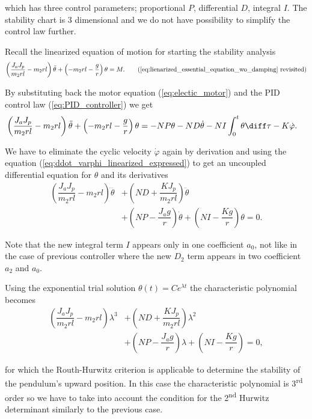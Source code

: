 \noindent
which has three control parameters; proportional $P$, differential $D$, integral $I$. The stability chart is 3 dimensional and we do not have possibility to simplify the control law further.

Recall the linearized equation of motion for starting the stability analysis
\begin{align*}
	\left(\dfrac{J_a J_p}{m_2 r l}- m_2 r l\right) \ddot \theta + \left(-m_2 r l - \dfrac{g}{r}\right) \theta = M. \tag{\ref{eq:lienarized_essential_equation_wo_damping} revisited}
\end{align*}


\noindent
By substituting back the motor equation (\ref{eq:electic_motor}) and the PID control law (\ref{eq:PID_controller}) we get
\begin{align}
	\left(\dfrac{J_a J_p}{m_2 r l}- m_2 r l\right) \ddot \theta + \left(-m_2 r l - \dfrac{g}{r}\right) \theta &=  -NP\theta -ND\dot{\theta} - NI \int_{0}^{t} \theta \diff \tau -K\dot{\varphi}.
\end{align}


\noindent
We have to eliminate the cyclic velocity $\dot{\varphi}$ again by derivation and using the equation (\ref{eq:ddot_varphi_linearized_expressed}) to get an uncoupled differential equation for $\theta$ and its derivatives 
\begin{align}
	\left(\dfrac{J_a J_p}{m_2 r l}- m_2 r l\right) \dddot \theta 
	&+
	\left( ND + \dfrac{KJ_p}{m_2 r l}\right) \ddot\theta
	\nonumber \\
	&+
	\left(NP - \dfrac{J_a g}{r}\right) \dot \theta
	+
	\left(NI-\dfrac{Kg}{r}\right) \theta = 0. 
\end{align}

\noindent
Note that the new integral term $I$ appears only in one coefficient $a_0$, not like in the case of previous \PDD{} controller where the new $D_2$ term appears in two coefficient $a_2$ and $a_0$.

Using the exponential trial solution $\theta(t) = Ce^{\lambda t} $ the characteristic polynomial becomes
\begin{align}
	\left(\dfrac{J_a J_p}{m_2 r l}- m_2 r l\right) \lambda^3 
	&+
	\left( ND + \dfrac{KJ_p}{m_2 r l}\right) \lambda^2
	\nonumber \\
	&+
	\left(NP - \dfrac{J_a g}{r}\right) \lambda
	+
	\left( NI-\dfrac{Kg}{r}\right) = 0, \label{eq:PID_charpoly}
\end{align}

\noindent 
for which the Routh-Hurwitz criterion is applicable to determine the stability of the pendulum's upward position. In this case  the characteristic polynomial is 3\textsuperscript{rd} order so we have to take into account the condition for the 2\textsuperscript{nd} Hurwitz determinant similarly to the previous case.

